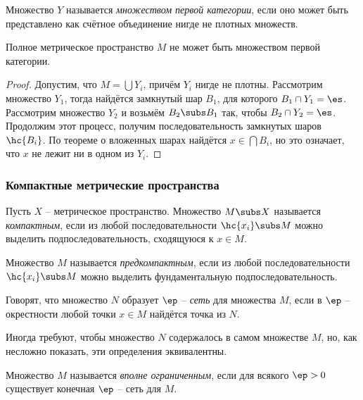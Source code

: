 \documentclass[a4paper]{article}
\begin{document}
\begin{df}
Множество $Y$ называется \emph{множеством первой категории}, если оно может быть представлено как счётное
объединение нигде не плотных множеств.
\end{df}

\begin{theorem}
Полное метрическое пространство $M$ не может быть множеством первой категории.
\end{theorem}
\begin{proof}
Допустим, что $M = \bigcup Y_i$, причём $Y_i$ нигде не плотны.
Рассмотрим множество $Y_1$, тогда найдётся замкнутый шар $B_1$, для которого $B_1 \cap Y_1 = \es$.
Рассмотрим множество $Y_2$ и возьмём $B_2 \subs B_1$ так, чтобы $B_2 \cap Y_2 = \es$.
Продолжим этот процесс, получим последовательность замкнутых шаров $\hc{B_i}$. По теореме о вложенных шарах
найдётся $x \in \bigcap B_i$, но это означает, что $x$ не лежит ни в одном из $Y_i$.
\end{proof}

\subsubsection{Компактные метрические пространства}

\begin{df}
Пусть $X$ -- метрическое пространство. Множество $M \subs X$ называется \emph{компактным},
если из любой последовательности $\hc{x_i} \subs M$ можно выделить подпоследовательность,
сходящуюся к $x \in M$.
\end{df}

\begin{df}
Множество $M$ называется \emph{предкомпактным}, если
из любой последовательности $\hc{x_i} \subs M$ можно выделить фундаментальную
подпоследовательность.
\end{df}

\begin{df}
Говорят, что множество $N$ образует $\ep$ -- \emph{сеть} для множества $M$,
если в $\ep$ -- окрестности любой точки $x \in M$ найдётся точка из $N$.
\end{df}

\begin{note}
Иногда требуют, чтобы множество $N$ содержалось в самом множестве $M$,
но, как несложно показать, эти определения эквивалентны.
\end{note}

\begin{df}
Множество $M$ называется \emph{вполне ограниченным}, если для всякого $\ep > 0$
существует конечная $\ep$ -- сеть для $M$.
\end{df}
\end{document}

